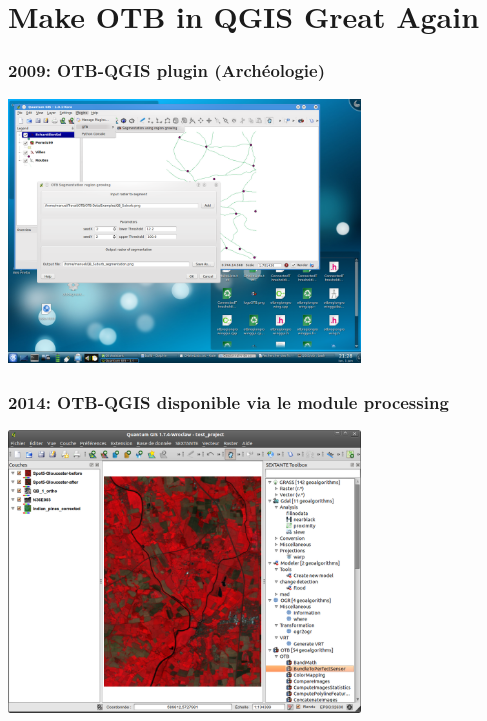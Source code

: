 \documentclass[8pt]{beamer}
\begin{document}
\section{Make OTB in QGIS Great Again}

\begin{frame}
\frametitle{2009: OTB-QGIS plugin (Archéologie)}
\begin{minipage}[t][6cm][t]{\textwidth}
\begin{center}
\includegraphics[width=0.7\textwidth]{images/otb-qgis-2009.png}
\end{center}
\end{minipage}
\end{frame}

\begin{frame}
\frametitle{2014: OTB-QGIS disponible via le module processing}
\begin{minipage}[t][6cm][t]{\textwidth}
\begin{center}
\includegraphics[width=0.7\textwidth]{images/otb_qgis.png}
\end{center}
\end{minipage}
\end{frame}
\end{document}
